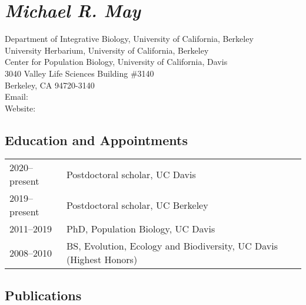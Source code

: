 
\section*{\itshape Michael R. May}

\begin{adjustwidth}{1em}{}
Department of Integrative Biology, University of California, Berkeley\\
University Herbarium, University of California, Berkeley\\
Center for Population Biology, University of California, Davis\\

3040 Valley Life Sciences Building \#3140\\
Berkeley, CA 94720-3140\\
Email: \href{href:mikeryanmay@gmail.com}{}\\
Website: \href{https://mikeryanmay.github.io/}{}
\end{adjustwidth}

\subsection*{Education and Appointments}

\begin{tabularx}{\textwidth}{@{\hspace{1em}}lX}
    2020--present & Postdoctoral scholar, UC Davis\\
    2019--present & Postdoctoral scholar, UC Berkeley\\
    2011--2019    & PhD, Population Biology, UC Davis\\
    2008--2010    & BS, Evolution, Ecology and Biodiversity, UC Davis (Highest Honors)
\end{tabularx}

\subsection*{Publications}

